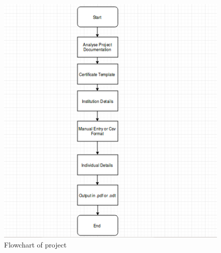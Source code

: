 \begin{figure}[!ht]
\centering
\includegraphics[width=1\textwidth]{images/design.png}                   
\caption{Flowchart of project}
\hspace{-1.5em}
\end{figure}
